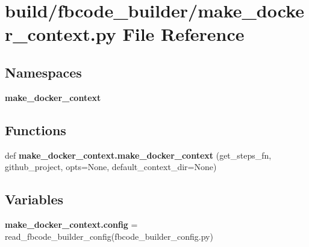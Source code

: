 \section{build/fbcode\+\_\+builder/make\+\_\+docker\+\_\+context.py File Reference}
\label{make__docker__context_8py}
\subsection*{Namespaces}
\begin{DoxyCompactItemize}
\item 
 {\bf make\+\_\+docker\+\_\+context}
\end{DoxyCompactItemize}
\subsection*{Functions}
\begin{DoxyCompactItemize}
\item 
def {\bf make\+\_\+docker\+\_\+context.\+make\+\_\+docker\+\_\+context} (get\+\_\+steps\+\_\+fn, github\+\_\+project, opts=None, default\+\_\+context\+\_\+dir=None)
\end{DoxyCompactItemize}
\subsection*{Variables}
\begin{DoxyCompactItemize}
\item 
{\bf make\+\_\+docker\+\_\+context.\+config} = read\+\_\+fbcode\+\_\+builder\+\_\+config(\textquotesingle{}fbcode\+\_\+builder\+\_\+config.\+py\textquotesingle{})
\end{DoxyCompactItemize}
